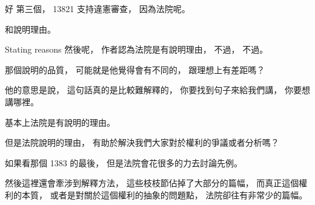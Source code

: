 \hypertarget{w06:cue:2573}{}好 第三個，
\hypertarget{w06:cue:2574}{}13821
\hypertarget{w06:cue:2575}{}支持違憲審查，
\hypertarget{w06:cue:2576}{}因為法院呢。

\hypertarget{w06:cue:2577}{}和說明理由。

\hypertarget{w06:cue:2578}{}Stating reasons
\hypertarget{w06:cue:2579}{}然後呢，
\hypertarget{w06:cue:2580}{}作者認為法院是有說明理由，
\hypertarget{w06:cue:2581}{}不過，
\hypertarget{w06:cue:2582}{}不過。

\hypertarget{w06:cue:2583}{}那個說明的品質，
\hypertarget{w06:cue:2584}{}可能就是他覺得會有不同的，
\hypertarget{w06:cue:2585}{}跟理想上有差距嗎？

\hypertarget{w06:cue:2586}{}他的意思是說，
\hypertarget{w06:cue:2587}{}這句話真的是比較難解釋的，
\hypertarget{w06:cue:2588}{}你要找到句子來給我們講，
\hypertarget{w06:cue:2589}{}你要想講哪裡。

\hypertarget{w06:cue:2590}{}基本上法院是有說明的理由。

\hypertarget{w06:cue:2591}{}但是法院說明的理由，
\hypertarget{w06:cue:2592}{}有助於解決我們大家對於權利的爭議或者分析嗎？

\hypertarget{w06:cue:2593}{}如果看那個 1383 的最後，
\hypertarget{w06:cue:2594}{}但是法院會花很多的力去討論先例。

\hypertarget{w06:cue:2595}{}然後這裡還會牽涉到解釋方法，
\hypertarget{w06:cue:2596}{}這些枝枝節佔掉了大部分的篇幅，
\hypertarget{w06:cue:2597}{}而真正這個權利的本質，
\hypertarget{w06:cue:2598}{}或者是對關於這個權利的抽象的問題點，
\hypertarget{w06:cue:2599}{}法院卻往有非常少的篇幅。

